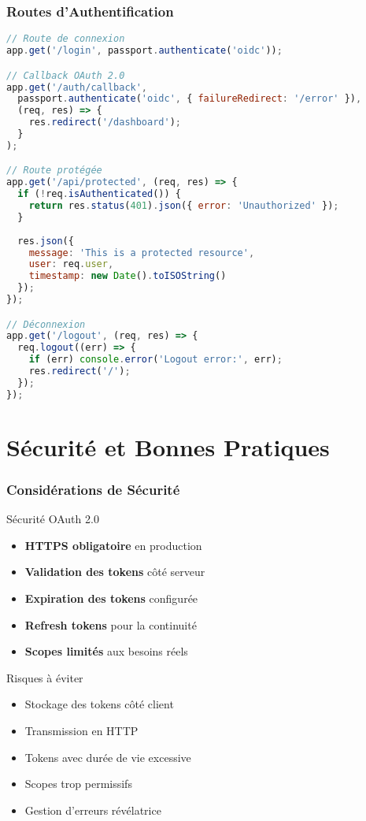 \documentclass[aspectratio=169]{beamer}
\begin{document}
\begin{frame}[fragile]
    \frametitle{Routes d'Authentification}
    \begin{lstlisting}[language=JavaScript, caption=Routes Express.js]
// Route de connexion
app.get('/login', passport.authenticate('oidc'));

// Callback OAuth 2.0
app.get('/auth/callback', 
  passport.authenticate('oidc', { failureRedirect: '/error' }),
  (req, res) => {
    res.redirect('/dashboard');
  }
);

// Route protégée
app.get('/api/protected', (req, res) => {
  if (!req.isAuthenticated()) {
    return res.status(401).json({ error: 'Unauthorized' });
  }
  
  res.json({
    message: 'This is a protected resource',
    user: req.user,
    timestamp: new Date().toISOString()
  });
});

// Déconnexion
app.get('/logout', (req, res) => {
  req.logout((err) => {
    if (err) console.error('Logout error:', err);
    res.redirect('/');
  });
});
    \end{lstlisting}
\end{frame}

\section{Sécurité et Bonnes Pratiques}

\begin{frame}
    \frametitle{Considérations de Sécurité}
    \begin{block}{Sécurité OAuth 2.0}
        \begin{itemize}
            \item \textbf{HTTPS obligatoire} en production
            \item \textbf{Validation des tokens} côté serveur
            \item \textbf{Expiration des tokens} configurée
            \item \textbf{Refresh tokens} pour la continuité
            \item \textbf{Scopes limités} aux besoins réels
        \end{itemize}
    \end{block}
    
    \begin{alertblock}{Risques à éviter}
        \begin{itemize}
            \item Stockage des tokens côté client
            \item Transmission en HTTP
            \item Tokens avec durée de vie excessive
            \item Scopes trop permissifs
            \item Gestion d'erreurs révélatrice
        \end{itemize}
    \end{alertblock}
\end{frame}
\end{document}
